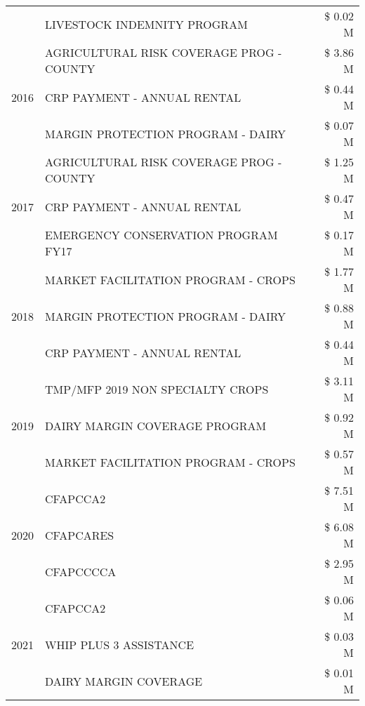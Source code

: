 \begin{tabular}{llr}
 & LIVESTOCK INDEMNITY PROGRAM & \$ 0.02 M \\
\cline{1-3}
\multirow[t]{3}{*}{2016} & AGRICULTURAL RISK COVERAGE PROG - COUNTY & \$ 3.86 M \\
 & CRP PAYMENT - ANNUAL RENTAL & \$ 0.44 M \\
 & MARGIN PROTECTION PROGRAM - DAIRY & \$ 0.07 M \\
\cline{1-3}
\multirow[t]{3}{*}{2017} & AGRICULTURAL RISK COVERAGE PROG - COUNTY & \$ 1.25 M \\
 & CRP PAYMENT - ANNUAL RENTAL & \$ 0.47 M \\
 & EMERGENCY CONSERVATION PROGRAM FY17 & \$ 0.17 M \\
\cline{1-3}
\multirow[t]{3}{*}{2018} & MARKET FACILITATION PROGRAM - CROPS & \$ 1.77 M \\
 & MARGIN PROTECTION PROGRAM - DAIRY & \$ 0.88 M \\
 & CRP PAYMENT - ANNUAL RENTAL & \$ 0.44 M \\
\cline{1-3}
\multirow[t]{3}{*}{2019} & TMP/MFP 2019 NON SPECIALTY CROPS & \$ 3.11 M \\
 & DAIRY MARGIN COVERAGE PROGRAM & \$ 0.92 M \\
 & MARKET FACILITATION PROGRAM - CROPS & \$ 0.57 M \\
\cline{1-3}
\multirow[t]{3}{*}{2020} & CFAPCCA2 & \$ 7.51 M \\
 & CFAPCARES & \$ 6.08 M \\
 & CFAPCCCCA & \$ 2.95 M \\
\cline{1-3}
\multirow[t]{3}{*}{2021} & CFAPCCA2 & \$ 0.06 M \\
 & WHIP PLUS 3 ASSISTANCE & \$ 0.03 M \\
 & DAIRY MARGIN COVERAGE & \$ 0.01 M \\
\cline{1-3}
\bottomrule
\end{tabular}
